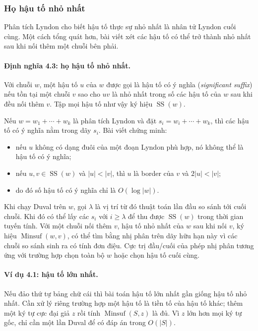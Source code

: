 \documentclass[11pt]{article}
\begin{document}
\subsubsection{Họ hậu tố nhỏ nhất}

Phân tích Lyndon cho biết hậu tố thực sự nhỏ nhất là nhân tử Lyndon cuối cùng.
Một cách tổng quát hơn, bài viết xét các hậu tố có thể trở thành nhỏ nhất sau khi
nối thêm một chuỗi bên phải.

\paragraph{Định nghĩa 4.3: họ hậu tố nhỏ nhất.}
Với chuỗi $w$, một hậu tố $u$ của $w$ được gọi là hậu tố có ý nghĩa
(\emph{significant suffix}) nếu tồn tại một chuỗi $v$ sao cho $uv$ là nhỏ nhất
trong số các hậu tố của $w$ sau khi đều nối thêm $v$. Tập mọi hậu tố như vậy ký
hiệu $\operatorname{SS}(w)$.

Nếu $w=w_1+\cdots+w_k$ là phân tích Lyndon và đặt
$s_i=w_i+\cdots+w_k$, thì các hậu tố có ý nghĩa nằm trong dãy $s_i$. Bài viết
chứng minh:
\begin{itemize}
  \item nếu $u$ không có dạng đuôi của một đoạn Lyndon phù hợp, nó không thể là
  hậu tố có ý nghĩa;
  \item nếu $u,v\in\operatorname{SS}(w)$ và $|u|<|v|$, thì $u$ là border của
  $v$ và $2|u|<|v|$;
  \item do đó số hậu tố có ý nghĩa chỉ là $O(\log |w|)$.
\end{itemize}

Khi chạy Duval trên $w$, gọi $\lambda$ là vị trí từ đó thuật toán lần đầu so sánh
tới cuối chuỗi. Khi đó có thể lấy các $s_i$ với $i\ge\lambda$ để thu được
$\operatorname{SS}(w)$ trong thời gian tuyến tính. Với một chuỗi nối thêm $v$,
hậu tố nhỏ nhất của $w$ sau khi nối $v$, ký hiệu
$\operatorname{Minsuf}(w,v)$, có thể tìm bằng nhị phân trên dãy hữu hạn này vì
các chuỗi so sánh sinh ra có tính đơn điệu. Cực trị đầu/cuối của phép nhị phân
tương ứng với trường hợp chọn toàn bộ $w$ hoặc chọn hậu tố cuối cùng.

\paragraph{Ví dụ 4.1: hậu tố lớn nhất.}
Nếu đảo thứ tự bảng chữ cái thì bài toán hậu tố lớn nhất gần giống hậu tố nhỏ
nhất. Cần xử lý riêng trường hợp một hậu tố là tiền tố của hậu tố khác; thêm một
ký tự cực đại giả $z$ rồi tính $\operatorname{Minsuf}(S,z)$ là đủ. Vì $z$ lớn hơn
mọi ký tự gốc, chỉ cần một lần Duval để có đáp án trong $O(|S|)$.
\end{document}
